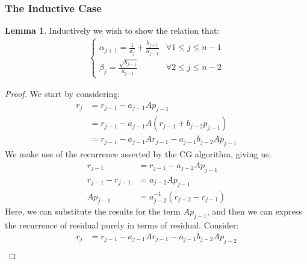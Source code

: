 \documentclass[]{article}
\theoremstyle{definition}
\newtheorem{lemma}{Lemma}[subsection]    %
\begin{document}
\begin{appendices}
        \subsubsection{The Inductive Case}
            \begin{lemma}
                Inductively we wish to show the relation that: 
                \begin{align}
                    \begin{cases}
                        \alpha_{j + 1} = \frac{1}{a_j} + \frac{b_{j - 1}}{a_{j - 1}}
                        & \forall 1 \le j \le n - 1
                        \\
                        \beta_{j} = \frac{\sqrt{b_{j - 1}}}{a_{j - 1}}
                        & \forall 2 \le j \le n - 2 
                    \end{cases}
                \end{align}
            \end{lemma}
            \begin{proof}
                We start by considering: 
                \begin{align}
                    r_j &= r_{j - 1} - a_{j -1 }Ap_{j - 1}
                    \\
                    & =r_{j - 1} - a_{j - 1} A(r_{j - 1} + b_{j - 2}p_{j - 1})
                    \\
                    &= r_{j - 1} - a_{j - 1}Ar_{j - 1} - a_{j - 1}b_{j - 2}Ap_{j - 1}
                \end{align}
                We make use of the recurrence asserted by the CG algorithm, giving us: 
                \begin{align}
                    r_{j - 1} &= r_{j - 1} - a_{j - 2}Ap_{j - 1}
                    \\
                    r_{j - 1} - r_{j - 1} &= a_{j - 2} Ap_{j - 1}
                    \\
                    Ap_{j - 1} &= a^{-1}_{j -2} 
                    \left(
                        r_{j - 2} - r_{j - 1}
                    \right)
                \end{align}
                Here, we can substitute the results for the term $Ap_{j - 1}$, and then we can express the recurrence of residual purely in terms of residual. Consider: 
                \begin{align}
                    r_{j} &= r_{j - 1} - a_{j - 1}Ar_{j - 1} - a_{j - 1}b_{j - 2}Ap_{j - 2}
                    \\

\end{align}
\end{proof}
\end{appendices}
\end{document}
